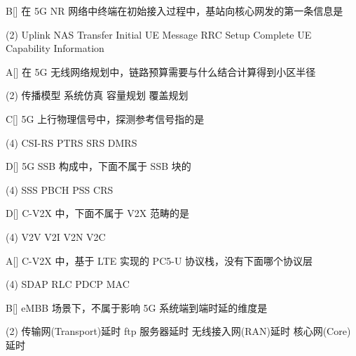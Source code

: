 \begin{choice}{B}[]
    在 5G NR 网络中终端在初始接入过程中，基站向核心网发的第一条信息是
    \begin{tasks}(2)
        \task Uplink NAS Transfer
        \task Initial UE Message
        \task RRC Setup Complete
        \task  UE Capability Information
    \end{tasks}
\end{choice}


\begin{choice}{A}[]
    在 5G 无线网络规划中，链路预算需要与什么结合计算得到小区半径
    \begin{tasks}(2)
        \task 传播模型
        \task 系统仿真
        \task 容量规划
        \task 覆盖规划
    \end{tasks}
\end{choice}



\begin{choice}{C}[]
    5G 上行物理信号中，探测参考信号指的是
    \begin{tasks}(4)
        \task CSI-RS
        \task PTRS
        \task SRS
        \task DMRS
    \end{tasks}
\end{choice}


\begin{choice}{D}[]
    5G SSB 构成中，下面不属于 SSB 块的
    \begin{tasks}(4)
        \task SSS
        \task PBCH
        \task PSS
        \task CRS
    \end{tasks}
\end{choice}


\begin{choice}{D}[]
    C-V2X 中，下面不属于 V2X 范畴的是
    \begin{tasks}(4)
        \task V2V
        \task V2I
        \task V2N
        \task  V2C
    \end{tasks}
\end{choice}


\begin{choice}{A}[]
    C-V2X 中，基于 LTE 实现的 PC5-U 协议栈，没有下面哪个协议层
    \begin{tasks}(4)
        \task SDAP
        \task RLC
        \task PDCP
        \task MAC
    \end{tasks}
\end{choice}


\begin{choice}{B}[]
    eMBB 场景下，不属于影响 5G 系统端到端时延的维度是
    \begin{tasks}(2)
        \task 传输网(Transport)延时
        \task ftp 服务器延时
        \task 无线接入网(RAN)延时
        \task 核心网(Core)延时
    \end{tasks}
\end{choice}



